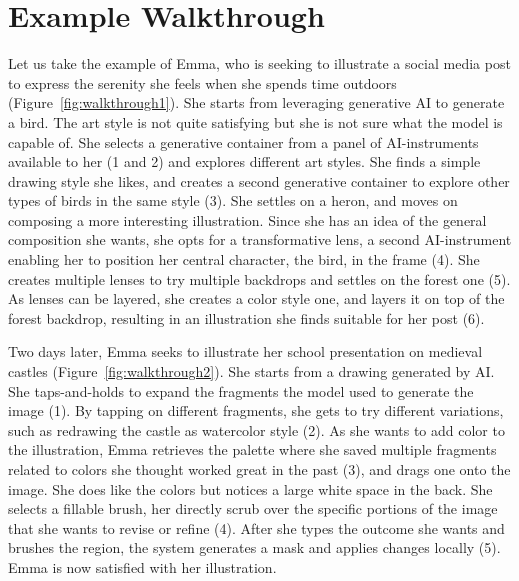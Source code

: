 



\section{Example Walkthrough}

Let us take the example of Emma, who is seeking to illustrate a social media post to express the serenity she feels when she spends time outdoors (Figure~\ref{fig:walkthrough1}). She starts from leveraging generative AI to generate a bird. The art style is not quite satisfying but she is not sure what the model is capable of. She selects a generative container from a panel of AI-instruments available to her (1 and 2) and explores different art styles. She finds a simple drawing style she likes, and creates a second generative container to explore other types of birds in the same style (3). She settles on a heron, and moves on composing a more interesting illustration. Since she has an idea of the general composition she wants, she opts for a transformative lens, a second AI-instrument enabling her to position her central character, the bird, in the frame (4). She creates multiple lenses to try multiple backdrops and settles on the forest one (5). As lenses can be layered, she creates a color style one, and layers it on top of the forest backdrop, resulting in an illustration she finds suitable for her post (6).

Two days later, Emma seeks to illustrate her school presentation on medieval castles (Figure~\ref{fig:walkthrough2}). She starts from a drawing generated by AI. She taps-and-holds to expand the fragments the model used to generate the image (1). By tapping on different fragments, she gets to try different variations, such as redrawing the castle as watercolor style (2). As she wants to add color to the illustration, Emma retrieves the palette where she saved multiple fragments related to colors she thought worked great in the past (3), and drags one onto the image. She does like the colors but notices a large white space in the back. She selects a fillable brush,  her directly scrub over the specific portions of the image that she wants to revise or refine (4). After she types the outcome she wants and brushes the region, the system generates a mask and applies changes locally (5). Emma is now satisfied with her illustration.





